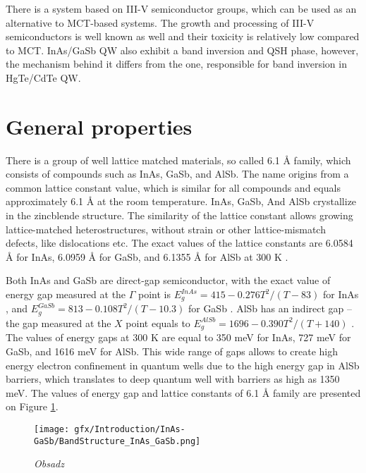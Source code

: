 \documentclass[titlepage,a4paper]{book}
\begin{document}
There is a system based on III-V semiconductor groups, which can be used as an alternative to MCT-based systems. The growth and processing of III-V semiconductors is well known as well and their toxicity is relatively low compared to MCT. InAs/GaSb QW also exhibit a band inversion and QSH phase, however, the mechanism behind it differs from the one, responsible for band inversion in HgTe/CdTe QW.

\section{General properties}
There is a group of well lattice matched materials, so called 6.1 Å family, which consists of compounds such as InAs, GaSb, and AlSb. The name origins from a common lattice constant value, which is similar for all compounds and equals approximately 6.1 Å at the room temperature. InAs, GaSb, And AlSb crystallize in the zincblende structure. The similarity of the lattice constant allows growing lattice-matched heterostructures, without strain or other lattice-mismatch defects, like dislocations etc. The exact values of the lattice constants are 6.0584 Å for InAs, 6.0959 Å for GaSb, and 6.1355 Å for AlSb at 300 K \cite{Sze}.

Both InAs and GaSb are direct-gap semiconductor, with the exact value of energy gap measured at the $\Gamma$ point is $E_g^{InAs} = 415-0.276 T^2/(T-83)$ for InAs \cite{Fang_InAs}, and $E_g^{GaSb} = 813 - 0.108 T^2/(T-10.3)$ for GaSb \cite{Wu_GaSb}. AlSb has an indirect gap – the gap measured at the $X$ point equals to $E_g^{AlSb} = 1696 - 0.390 T^2/(T+140)$ \cite{Vurgaftman_AlSb}. The values of energy gaps at 300 K are equal to 350 meV for InAs, 727 meV for GaSb, and 1616 meV for AlSb. This wide range of gaps allows to create high energy electron confinement in quantum wells due to the high energy gap in AlSb barriers, which translates to deep quantum well with barriers as high as 1350 meV. The values of energy gap and lattice constants of 6.1 Å family are presented on Figure \ref{fig:BandStructure_InAs_GaSb}.

\begin{figure}[ht]
	\centering
	\texttt{[image: gfx/Introduction/InAs-GaSb/BandStructure\_InAs\_GaSb.png]}
	\vspace{-10pt}
	\caption{\textit{Obsadz}}
	\label{fig:BandStructure_InAs_GaSb}
\end{figure} 
\end{document}
